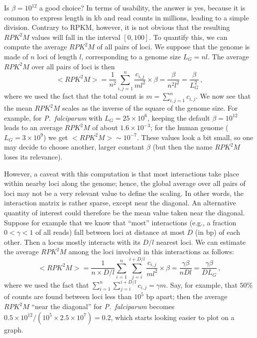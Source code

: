 \documentclass{article}
\begin{document}
Is $\beta=10^{12}$ a good choice? In terms of usability, the answer is
yes, because it is common to express length in kb and read counts in
millions, leading to a simple division. Contrary to RPKM, however, it
is not obvious that the resulting $RPK^2 M$ values will fall in the
interval $[0,100]$. To quantify this, we can compute the average
$RPK^2M$ of all pairs of loci. We suppose that the genome is made of
$n$ loci of length $l$, corresponding to a genome size $L_G = nl$. The
average $RPK^2M$ over all pairs of loci is then
\[
<RPK^2M> = \frac{1}{n^2} \sum_{i,j=1}^n \frac{c_{i,j}}{ml^2}\times \beta = \frac{\beta}{n^2 l^2} = \frac{\beta}{L_G^2}\,,
\]
where we used the fact that the total count is $m=\sum_{i,j=1}^n
c_{i,j}$. We now see that the mean $RPK^2M$ scales as the inverse of
the square of the genome size. For example, for {\em P.\ falciparum} with
$L_G = 25 \times 10^6$, keeping the default $\beta=10^{12}$ leads to an
average $RPK^2M$ of about $1.6\times10^{-3}$; for the human genome
($L_G=3\times 10^9$) we get $<RPK^2M> \sim 10^{-7}$. These values look a bit
small, so one may decide to choose another, larger constant $\beta$
(but then the name $RPK^2M$ loses its relevance).

However, a caveat with this computation is that most interactions take
place within nearby loci along the genome; hence, the global average
over all pairs of loci may not be a very relevant value to define the
scaling. In other words, the interaction matrix is rather sparse,
except near the diagonal. An alternative quantity of interest could
therefore be the mean value taken near the diagonal. Suppose for
example that we know that ``most'' interactions (e.g., a fraction
$0<\gamma<1$ of all reads) fall between loci at distance at most $D$
(in bp) of each other. Then a locus mostly interacts with its $D/l$
nearest loci.  We can estimate the average $RPK^2M$ among the loci
involved in this interactions as follows:
\[
<RPK^2M> = \frac{1}{n\times D/l} \sum_{i=1}^n \sum_{j=i}^{i+D/l}  \frac{c_{i,j}}{ml^2}\times \beta = \frac{\gamma \beta}{nDl} = \frac{\gamma\beta}{D L_G}\,,
\]
where we used the fact that $ \sum_{i=1}^n \sum_{j=i}^{i+D/l} c_{i,j}
= \gamma m$.  Say, for example, that $50\%$ of counts are found
between loci less than $10^5$ bp apart; then the average $RPK^2M$ ``near the
diagonal'' for {\em P.\ falciparum} becomes $0.5\times 10^{12} / (10^5
\times 2.5 \times 10^7) = 0.2$, which starts looking easier to plot on
a graph.
\end{document}
